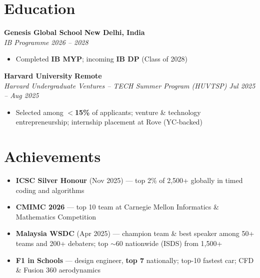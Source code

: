 \documentclass[11pt,letterpaper]{article}
\newcommand{\resumeSubheading}[4]{%
  \vspace{2pt}
  \textbf{#1} \hfill \textbf{#2} \\
  \textit{#3} \hfill \textit{#4} \\
}
\newcommand{\resumeItem}[1]{\item\small{#1}}
\begin{document}
\section{Education}

\resumeSubheading{Genesis Global School}{New Delhi, India}{IB Programme}{2026 -- 2028}
\begin{itemize}[leftmargin=*, nosep, topsep=2pt]
  \resumeItem{Completed \textbf{IB MYP}; incoming \textbf{IB DP} (Class of 2028)}
\end{itemize}

\resumeSubheading{Harvard University}{Remote}{Harvard Undergraduate Ventures -- TECH Summer Program (HUVTSP)}{Jul 2025 -- Aug 2025}
\begin{itemize}[leftmargin=*, nosep, topsep=2pt]
  \resumeItem{Selected among \textbf{$<$15\%} of applicants; venture \& technology entrepreneurship; internship placement at Rove (YC-backed)}
\end{itemize}

\section{Achievements}

\begin{itemize}[leftmargin=*, nosep, topsep=2pt]
  \resumeItem{\textbf{ICSC Silver Honour} (Nov 2025) --- top 2\% of 2,500+ globally in timed coding and algorithms}
  \resumeItem{\textbf{CMIMC 2026} --- top 10 team at Carnegie Mellon Informatics \& Mathematics Competition}
  \resumeItem{\textbf{Malaysia WSDC} (Apr 2025) --- champion team \& best speaker among 50+ teams and 200+ debaters; top $\sim$60 nationwide (ISDS) from 1,500+}
  \resumeItem{\textbf{F1 in Schools} --- design engineer, \textbf{top 7} nationally; top-10 fastest car; CFD \& Fusion 360 aerodynamics}
\end{itemize}
\end{document}
